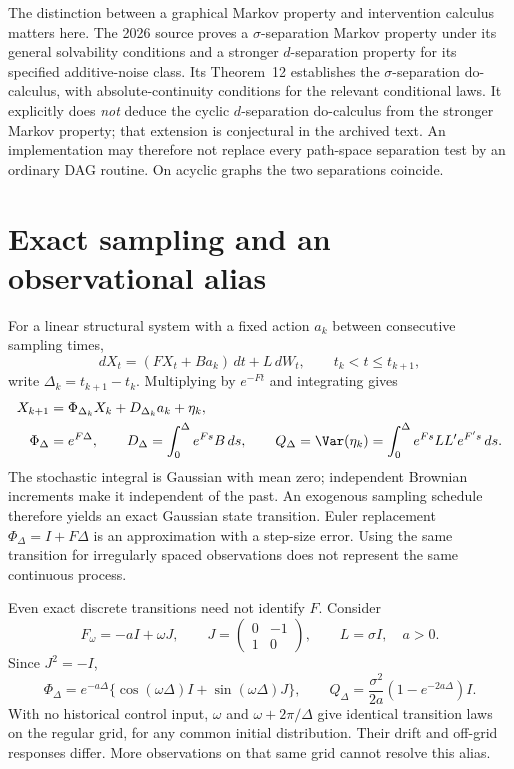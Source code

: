 The distinction between a graphical Markov property and intervention
calculus matters here. The 2026 source proves a $\sigma$-separation Markov
property under its general solvability conditions and a stronger
$d$-separation property for its specified additive-noise class. Its
Theorem~12 establishes the $\sigma$-separation do-calculus, with
absolute-continuity conditions for the relevant conditional laws.
It explicitly does \emph{not} deduce the cyclic $d$-separation do-calculus
from the stronger Markov property; that extension is conjectural in the
archived text. An implementation may therefore not replace every path-space
separation test by an ordinary DAG routine. On acyclic graphs the two
separations coincide.

\section{Exact sampling and an observational alias}
\label{r3:diffusion-alias}
For a linear structural system with a fixed action $a_k$ between consecutive
sampling times,
\[
 dX_t=(FX_t+Ba_k)\,dt+L\,dW_t,\qquad t_k<t\le t_{k+1},
\]
write $\Delta_k=t_{k+1}-t_k$. Multiplying by $e^{-Ft}$ and integrating gives
\begin{align}
 X_{k+1}&=\Phi_{\Delta_k}X_k+D_{\Delta_k}a_k+\eta_k,\\
 \Phi_\Delta&=e^{F\Delta},\qquad
 D_\Delta=\int_0^\Delta e^{Fs}B\,ds,\qquad
 Q_\Delta=\Var(\eta_k)=\int_0^\Delta e^{Fs}LL'e^{F's}\,ds .
 \label{r3:exact-sampling}
\end{align}
The stochastic integral is Gaussian with mean zero; independent Brownian
increments make it independent of the past. An exogenous sampling schedule
therefore yields an exact Gaussian state transition. Euler replacement
$\Phi_\Delta=I+F\Delta$ is an approximation with a step-size error.
Using the same transition for irregularly spaced observations does not
represent the same continuous process.

Even exact discrete transitions need not identify $F$. Consider
\[
 F_\omega=-aI+\omega J,\qquad
 J=\begin{pmatrix}0&-1\\1&0\end{pmatrix},\qquad L=\sigma I,\quad a>0 .
\]
Since $J^2=-I$,
\[
 \Phi_\Delta=e^{-a\Delta}
 \{\cos(\omega\Delta)I+\sin(\omega\Delta)J\},\qquad
 Q_\Delta=\frac{\sigma^2}{2a}(1-e^{-2a\Delta})I.
\]
With no historical control input, $\omega$ and
$\omega+2\pi/\Delta$ give identical transition laws on the regular grid,
for any common initial distribution. Their drift and off-grid responses
differ. More observations on that same grid cannot resolve this alias.

